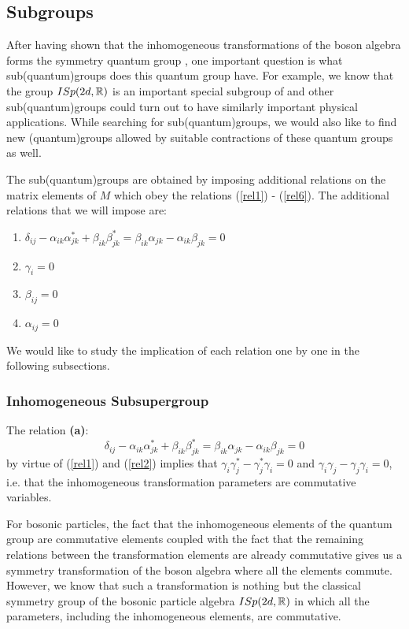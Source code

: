 \subsection{Subgroups}
After having shown that the inhomogeneous transformations of the boson
algebra forms the symmetry quantum group \BISp,
one important question is what sub(quantum)groups does this quantum
group have. For example, we know that the group $ISp(2d, \mathbb{R})$ is
an important special subgroup of \BISp and other
sub(quantum)groups could turn out to have similarly important
physical applications. While searching for sub(quantum)groups, we
would also like to find new (quantum)groups allowed by suitable
contractions \cite{inonu} of these quantum groups as well.

The sub(quantum)groups are obtained by imposing
additional relations on the matrix elements of $M$ which obey the
relations (\ref{rel1}) - (\ref{rel6}). The additional relations
that we will impose are:
\begin{enumerate}
\renewcommand{\labelenumi}{\bf(\alph{enumi})}
\item $\delta_{ij} - \alpha_{ik}\alpha^*_{jk} + \beta_{ik} \beta^*_{jk} = \beta_{ik} \alpha_{jk} - \alpha_{ik} \beta_{jk} = 0$
\item $\gamma_i = 0$
\item $\beta_{ij} = 0$
\item $\alpha_{ij} = 0$
\end{enumerate}

We would like to study the implication of each relation one by one
in the following subsections.

\subsubsection{Inhomogeneous Subsupergroup}

The relation {\bf(a)}:
\[
\delta_{ij} - \alpha_{ik}\alpha^*_{jk} + \beta_{ik} \beta^*_{jk}
= \beta_{ik} \alpha_{jk} - \alpha_{ik} \beta_{jk} = 0
\]
by virtue of (\ref{rel1}) and (\ref{rel2}) implies that $\gamma_i
\gamma^*_j - \gamma^*_j \gamma_i = 0$ and $\gamma_i \gamma_j -
\gamma_j \gamma_i = 0$, i.e. that the inhomogeneous transformation
parameters are commutative variables.

For bosonic particles, the fact that the inhomogeneous elements of the 
quantum group are commutative elements coupled with the fact that the
remaining relations between the transformation elements are already 
commutative gives us a symmetry transformation of the boson algebra
where all the elements commute. However, we know that such a transformation
is nothing but the classical symmetry group of the bosonic particle algebra $ISp(2d,
\mathbb{R})$ in which all the parameters, including the inhomogeneous
elements, are commutative.

